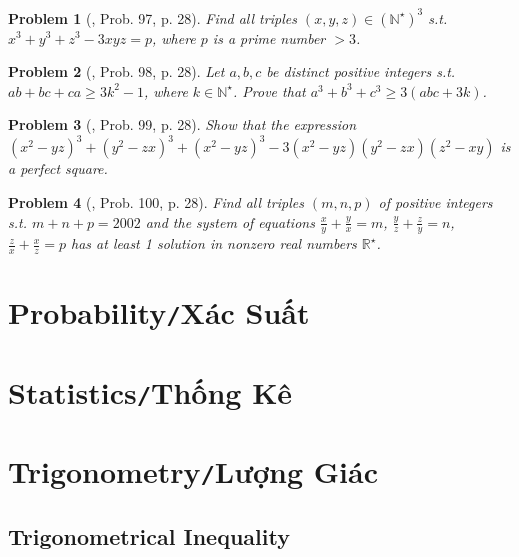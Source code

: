 \documentclass[oneside]{book}
\numberwithin{equation}{section}
\newtheorem{problem}{Problem}[section]
\begin{document}
\begin{problem}[\cite{Gelca_Andreescu2017}, Prob. 97, p. 28]
	Find all triples $(x,y,z)\in(\mathbb{N}^\star)^3$ s.t. $x^3 + y^3 + z^3 - 3xyz = p$, where $p$ is a prime number $> 3$.
\end{problem}

\begin{problem}[\cite{Gelca_Andreescu2017}, Prob. 98, p. 28]
	Let $a,b,c$ be distinct positive integers s.t. $ab + bc + ca\ge 3k^2 - 1$, where $k\in\mathbb{N}^\star$. Prove that $a^3 + b^3 + c^3\ge 3(abc + 3k)$.
\end{problem}

\begin{problem}[\cite{Gelca_Andreescu2017}, Prob. 99, p. 28]
	Show that the expression $(x^2 - yz)^3 + (y^2 - zx)^3 + (x^2 - yz)^3 - 3(x^2 - yz)(y^2 - zx)(z^2 - xy)$ is a perfect square.
\end{problem}

\begin{problem}[\cite{Gelca_Andreescu2017}, Prob. 100, p. 28]
	Find all triples $(m,n,p)$ of positive integers s.t. $m + n + p = 2002$ and the system of equations $\frac{x}{y} + \frac{y}{x} = m$, $\frac{y}{z} + \frac{z}{y} = n$, $\frac{z}{x} + \frac{x}{z} = p$ has at least 1 solution in nonzero real numbers $\mathbb{R}^\star$.
\end{problem}	


\chapter{Probability\texttt{/}Xác Suất}


\chapter{Statistics\texttt{/}Thống Kê}


\chapter{Trigonometry\texttt{/}Lượng Giác}

\section{Trigonometrical Inequality}
\end{document}
